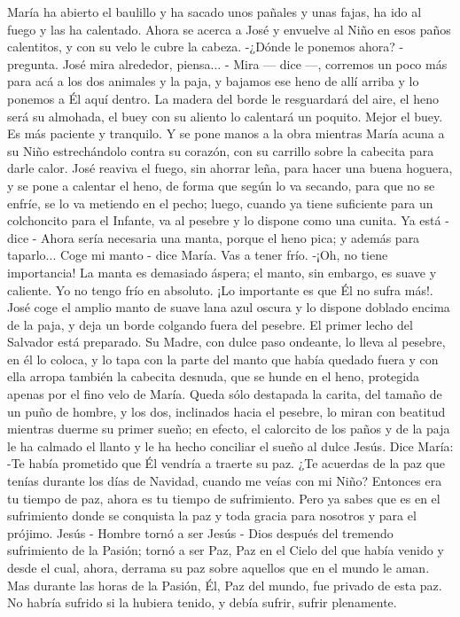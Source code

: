 \documentclass[12pt]{book} %
\begin{document}
María ha abierto el baulillo y ha sacado unos pañales y unas fajas, ha ido al fuego y las ha calentado. Ahora se acerca a José y envuelve al Niño en esos paños calentitos, y con su velo le cubre la cabeza. 
-¿Dónde le ponemos ahora? - pregunta. 
José mira alrededor, piensa... 
- Mira — dice —, corremos un poco más para acá a los dos animales y la paja, y bajamos ese heno de allí arriba y lo ponemos a Él aquí dentro. La madera del borde le resguardará del aire, el heno será su almohada, el buey con su aliento lo calentará un poquito. Mejor el buey. Es más paciente y tranquilo. 
Y se pone manos a la obra mientras María acuna a su Niño estrechándolo contra su corazón, con su carrillo sobre la 
cabecita para darle calor. 
José reaviva el fuego, sin ahorrar leña, para hacer una buena hoguera, y se pone a calentar el heno, de forma que según 
lo va secando, para que no se enfríe, se lo va metiendo en el pecho; luego, cuando ya tiene suficiente para un colchoncito para el Infante, va al pesebre y lo dispone como una cunita. 
Ya está - dice - Ahora sería necesaria una manta, porque el heno pica; y además para taparlo... 
Coge mi manto - dice María. 
Vas a tener frío. 
-¡Oh, no tiene importancia! La manta es demasiado áspera; el manto, sin embargo, es suave y caliente. Yo no tengo frío 
en absoluto. ¡Lo importante es que Él no sufra más!. 
José coge el amplio manto de suave lana azul oscura y lo dispone doblado encima de la paja, y deja un borde colgando 
fuera del pesebre. El primer lecho del Salvador está preparado. 
Su Madre, con dulce paso ondeante, lo lleva al pesebre, en él lo coloca, y lo tapa con la parte del manto que había quedado fuera y con ella arropa también la cabecita desnuda, que se hunde en el heno, protegida apenas por el fino velo de María. Queda sólo destapada la carita, del tamaño de un puño de hombre, y los dos, inclinados hacia el pesebre, lo miran con beatitud mientras duerme su primer sueño; en efecto, el calorcito de los paños y de la paja le ha calmado el llanto y le ha hecho conciliar el sueño al dulce Jesús. 
Dice María: 
-Te había prometido que Él vendría a traerte su paz. ¿Te acuerdas de la paz que tenías durante los días de Navidad, cuando me veías con mi Niño? Entonces era tu tiempo de paz, ahora es tu tiempo de sufrimiento. Pero ya sabes que es en el sufrimiento donde se conquista la paz y toda gracia para nosotros y para el prójimo. Jesús - Hombre tornó a ser Jesús - Dios después del tremendo sufrimiento de la Pasión; tornó a ser Paz, Paz en el Cielo del que había venido y desde el cual, ahora, derrama su paz sobre aquellos que en el mundo le aman. Mas durante las horas de la Pasión, Él, Paz del mundo, fue privado de esta paz. No habría sufrido si la hubiera tenido, y debía sufrir, sufrir plenamente. 
\end{document}
